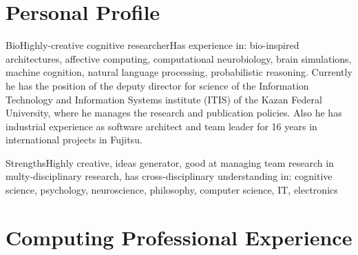 \documentclass{moderncv}
\begin{document}
\makecvtitle

 
\section{Personal Profile}

\cventry
{Bio}{Highly-creative cognitive researcher}{}{}{}{Has experience in: bio-inspired architectures, affective computing, computational neurobiology, brain simulations, machine cognition, natural language processing, probabilistic reasoning. Currently he has the position of the deputy director for science of the Information Technology and Information Systems institute (ITIS) of the Kazan Federal University, where he manages the research and publication policies. Also he has industrial experience as software architect and team leader for 16 years in international projects in Fujitsu.}

\cvitem
{Strengths}{Highly creative, ideas generator, good at managing team research in multy-disciplinary research, has cross-disciplinary understanding in: cognitive science, psychology, neuroscience, philosophy, computer science, IT, electronics}

\section{Computing Professional Experience}

\end{document}
